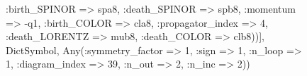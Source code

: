 \documentclass{revtex4}
\begin{document}
\begin{figure}[!htb]
\begin{center}
{:birth_SPINOR => spa8, :death_SPINOR => spb8, :momentum => -q1, :birth_COLOR => cla8, :propagator_index => 4, :death_LORENTZ => mub8, :death_COLOR => clb8))], Dict{Symbol, Any}(:symmetry_factor => 1, :sign => 1, :n_loop => 1, :diagram_index => 39, :n_out => 2, :n_inc => 2)) 
}
\end{center}
\end{figure}
\end{document}
